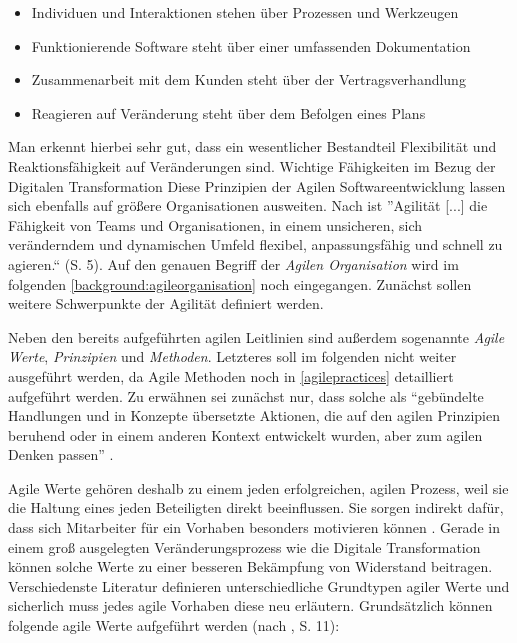 \begin{itemize}[noitemsep, topsep=0pt]
	\item Individuen und Interaktionen stehen über Prozessen und Werkzeugen
	\item Funktionierende Software steht über einer umfassenden Dokumentation
	\item Zusammenarbeit mit dem Kunden steht über der Vertragsverhandlung
	\item Reagieren auf Veränderung steht über dem Befolgen eines Plans
\end{itemize}

Man erkennt hierbei sehr gut, dass ein wesentlicher Bestandteil Flexibilität und Reaktionsfähigkeit auf Veränderungen sind. Wichtige Fähigkeiten im Bezug der Digitalen Transformation  Diese Prinzipien der Agilen Softwareentwicklung lassen sich ebenfalls auf größere Organisationen ausweiten. Nach  ist ''Agilität [...] die Fähigkeit von Teams und Organisationen, in einem unsicheren, sich veränderndem und dynamischen Umfeld flexibel, anpassungsfähig und schnell zu agieren.`` (S. 5). Auf den genauen Begriff der \textit{Agilen Organisation} wird im  folgenden \ref{background:agileorganisation} noch eingegangen. Zunächst sollen weitere Schwerpunkte der Agilität definiert werden.

Neben den bereits aufgeführten agilen Leitlinien sind außerdem sogenannte \textit{Agile Werte}, \textit{Prinzipien} und \textit{Methoden}. Letzteres soll im folgenden nicht weiter ausgeführt werden, da Agile Methoden noch in \ref{agilepractices} detailliert aufgeführt werden. Zu erwähnen sei zunächst nur, dass solche als ``gebündelte Handlungen und in Konzepte übersetzte Aktionen, die auf den agilen Prinzipien beruhend oder in einem anderen Kontext entwickelt wurden, aber zum agilen Denken passen'' \cite[S. 17]{hofert_agiler_2016}.

Agile Werte gehören deshalb zu einem jeden erfolgreichen, agilen Prozess, weil sie die Haltung eines jeden Beteiligten direkt beeinflussen. Sie sorgen indirekt dafür, dass sich Mitarbeiter für ein Vorhaben besonders motivieren können \cite[S. 10]{hofert_agiler_2016}. Gerade in einem groß ausgelegten Veränderungsprozess wie die Digitale Transformation können solche Werte zu einer besseren Bekämpfung von Widerstand beitragen. Verschiedenste Literatur definieren  unterschiedliche Grundtypen agiler Werte und sicherlich muss jedes agile Vorhaben diese neu erläutern. Grundsätzlich können folgende agile Werte aufgeführt werden  (nach , S. 11):

